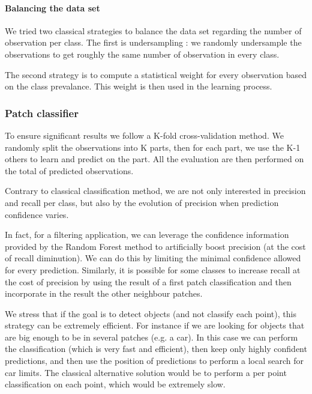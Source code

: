 			\paragraph{Balancing the data set} 
				We tried two classical strategies to balance the data set regarding the number of observation per class.
				The first is undersampling : we randomly undersample the observations to get roughly the same number of observation in every class.
				
				The second strategy is to compute a statistical weight for every observation based on the class prevalance. 
				This weight is then used in the learning process.
				
		
		\subsubsection{Patch classifier}
 
				
				To ensure significant results we follow a K-fold cross-validation method. 
				We randomly split the observations into K parts, then for each part, we use the K-1 others to learn and predict on the part.
				All the evaluation are then performed on the total of predicted observations.
				
				
				Contrary to classical classification method, we are not only interested in precision and recall per class, but also by the evolution of precision when prediction confidence varies.
				
				In fact, for a filtering application, we can leverage the confidence information provided by the Random Forest method to artificially boost precision (at the cost of recall diminution). We can do this by limiting the minimal confidence allowed for every prediction.
				Similarly, it is possible for some classes to increase recall at the cost of precision by using the result of a first patch classification and then incorporate in the result the other neighbour patches. 
			 	
			 	We stress that if the goal is to detect objects (and not classify each point), this strategy can be extremely efficient.
			 	For instance if we are looking for objects that are big enough to be in several patches (e.g. a car).
			 	In this case we can perform the classification (which is very fast and efficient), then keep only highly confident predictions, and then use the position of predictions to perform a local search for car limits.
			 	The classical alternative solution would be to perform a per point classification on each point, which would be extremely slow.
			 	
